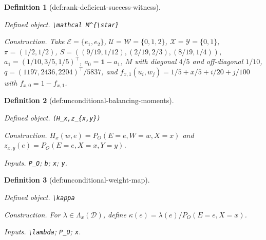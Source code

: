 \documentclass{article}
\newtheorem{definition}{Definition}
\begin{document}
\begin{definition}[def:rank-deficient-success-witness]\label{def:rank-deficient-success-witness}
\par\smallskip\noindent\emph{Defined object.} \texttt{\textbackslash{}\allowbreak{}mathcal M\textasciicircum{}\{\textbackslash{}\allowbreak{}star\}\allowbreak{}}
\par\smallskip\noindent\emph{Construction.} Take \(\mathcal E=\{e_1,e_2\}\), \(\mathcal U=\mathcal W=\{0,1,2\}\), \(\mathcal X=\mathcal Y=\{0,1\}\), \(\pi=(1/2,1/2)\), \(S=((9/19,1/12),(2/19,2/3),(8/19,1/4))\), \(a_1=(1/10,3/5,1/5)^{\top}\), \(a_0=\mathbf 1-a_1\), \(M\) with diagonal \(4/5\) and off-diagonal \(1/10\), \(q=(1197,2436,2204)^{\top}/5837\), and \(f_{x,1}(u_i,w_j)=1/5+x/5+i/20+j/100\) with \(f_{x,0}=1-f_{x,1}\).
\end{definition}

\begin{definition}[def:unconditional-balancing-moments]\label{def:unconditional-balancing-moments}
\par\smallskip\noindent\emph{Defined object.} \texttt{(H\_\allowbreak{}x,\allowbreak{}z\_\allowbreak{}\{x,\allowbreak{}y\}\allowbreak{})}
\par\smallskip\noindent\emph{Construction.} \(H_x(w,e)=P_O(E=e,W=w,X=x)\) and \(z_{x,y}(e)=P_O(E=e,X=x,Y=y)\).
\par\smallskip\noindent\emph{Inputs.} \texttt{P\_\allowbreak{}O}; \texttt{b}; \texttt{x}; \texttt{y}.
\end{definition}

\begin{definition}[def:unconditional-weight-map]\label{def:unconditional-weight-map}
\par\smallskip\noindent\emph{Defined object.} \texttt{\textbackslash{}\allowbreak{}kappa}
\par\smallskip\noindent\emph{Construction.} For \(\lambda\in\Lambda_x(\mathcal D)\), define \(\kappa(e)=\lambda(e)/P_O(E=e,X=x)\).
\par\smallskip\noindent\emph{Inputs.} \texttt{\textbackslash{}\allowbreak{}lambda}; \texttt{P\_\allowbreak{}O}; \texttt{x}.
\end{definition}
\end{document}

